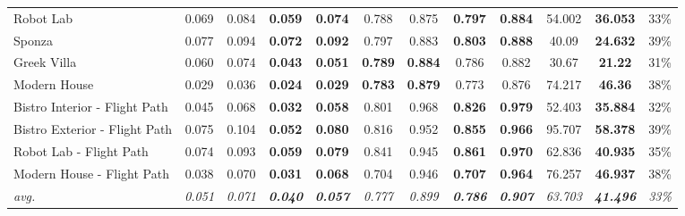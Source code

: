 \begin{table*}
\begin{tabular}{l cccc|cccc|ccc}
Robot Lab                     & 0.069          & 0.084          & \textbf{0.059}          & \textbf{0.074}          & 0.788          & 0.875          & \textbf{0.797}          & \textbf{0.884}          & 54.002          & \textbf{36.053}          & 33\%          \\
Sponza                        & 0.077          & 0.094          & \textbf{0.072}          & \textbf{0.092}          & 0.797          & 0.883          & \textbf{0.803}          & \textbf{0.888}          & 40.09          & \textbf{24.632}          & 39\%          \\
Greek Villa                   & 0.060          & 0.074          & \textbf{0.043}          & \textbf{0.051}          & \textbf{0.789} & \textbf{0.884} & 0.786                   & 0.882                   & 30.67          & \textbf{21.22}          & 31\%          \\
Modern House                  & 0.029          & 0.036          & \textbf{0.024}          & \textbf{0.029}          & \textbf{0.783} & \textbf{0.879} & 0.773                   & 0.876                   & 74.217          & \textbf{46.36}          & 38\%          \\
Bistro Interior - Flight Path & 0.045          & 0.068          & \textbf{0.032}          & \textbf{0.058}          & 0.801          & 0.968          & \textbf{0.826}          & \textbf{0.979}          & 52.403          & \textbf{35.884}          & 32\%          \\
Bistro Exterior - Flight Path & 0.075          & 0.104          & \textbf{0.052}          & \textbf{0.080}          & 0.816          & 0.952          & \textbf{0.855}          & \textbf{0.966}          & 95.707         & \textbf{58.378}         & 39\%          \\
Robot Lab - Flight Path       & 0.074          & 0.093          & \textbf{0.059}          & \textbf{0.079}          & 0.841          & 0.945          & \textbf{0.861}          & \textbf{0.970}          & 62.836          & \textbf{40.935}          & 35\%          \\
Modern House - Flight Path    & 0.038          & 0.070          & \textbf{0.031}          & \textbf{0.068}          & 0.704          & 0.946          & \textbf{0.707}          & \textbf{0.964}          & 76.257          & \textbf{46.937}          & 38\%          \\
\hline
\textit{avg.}                 & \textit{0.051} & \textit{0.071} & \textit{\textbf{0.040}} & \textit{\textbf{0.057}} & \textit{0.777} & \textit{0.899} & \textit{\textbf{0.786}} & \textit{\textbf{0.907}} & \textit{63.703} & \textit{\textbf{41.496}} & \textit{33\%}

\end{tabular}
\end{table*}
